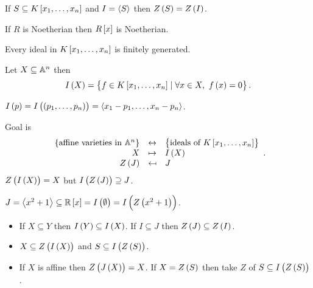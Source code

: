 \begin{remark}
If $ S \subseteq K\sbr{x_1, \dots, x_n} $ and $ I = \left\langle S \right\rangle $ then $ Z\br{S} = Z\br{I} $.
\end{remark}

\begin{theorem}
If $ R $ is Noetherian then $ R\sbr{x} $ is Noetherian.
\end{theorem}

\begin{corollary}
Every ideal in $ K\sbr{x_1, \dots, x_n} $ is finitely generated.
\end{corollary}

\begin{definition}
Let $ X \subseteq \mathbb{A}^n $ then
$$ I\br{X} = \cbr{f \in K\sbr{x_1, \dots, x_n} \mid \forall x \in X, \ f\br{x} = 0}. $$
\end{definition}

\begin{example}
$ I\br{p} = I\br{\br{p_1, \dots, p_n}} = \abr{x_1 - p_1, \dots, x_n - p_n} $.
\end{example}

Goal is
$$
\begin{array}{rcl}
\cbr{\text{affine varieties in} \ \A^n} & \leftrightarrow & \cbr{\text{ideals of} \ K\sbr{x_1, \dots, x_n}} \\
X & \mapsto & I\br{X} \\
Z\br{J} & \mapsfrom & J
\end{array}.
$$
$ Z\br{I\br{X}} = X $ but $ I\br{Z\br{J}} \supseteq J $.

\begin{example}
$ J = \abr{x^2 + 1} \subseteq \R\sbr{x} = I\br{\emptyset} = I\br{Z\br{x^2 + 1}} $.
\end{example}

\begin{proposition}
\hfill
\begin{itemize}
\item If $ X \subseteq Y $ then $ I\br{Y} \subseteq I\br{X} $. If $ I \subseteq J $ then $ Z\br{J} \subseteq Z\br{I} $.
\item $ X \subseteq Z\br{I\br{X}} $ and $ S \subseteq I\br{Z\br{S}} $.
\item If $ X $ is affine then $ Z\br{J\br{X}} = X $. If $ X = Z\br{S} $ then take $ Z $ of $ S \subseteq I\br{Z\br{S}} $.
\end{itemize}
\end{proposition}

